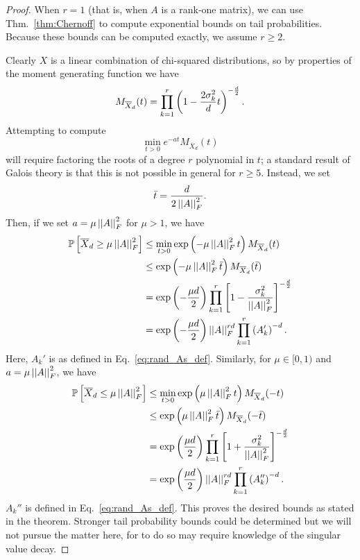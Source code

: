 \begin{proof}
When $r=1$ (that is, when $A$ is a rank-one matrix),
we can use Thm.~\ref{thm:Chernoff} to compute exponential
bounds on tail probabilities.
Because these bounds can be computed exactly, we assume $r\ge2$.

Clearly $X$ is a linear combination of chi-squared distributions,
so by properties of the moment generating function we have
%
\begin{equation}
    M_{\overline{X}_{d}}(t) =
    \prod_{k=1}^{r}
    \left( 1 - \frac{2\sigma_{k}^{2}}{d}t \right)^{-\frac{d}{2}}.
\end{equation}
%
Attempting to compute
%
\begin{equation}
    \min_{t>0} e^{-at}M_{\overline{X}_{d}}(t)
\end{equation}
%
will require factoring the roots of a degree $r$ polynomial in $t$;
a standard result of Galois theory is that this is not possible
in general for $r\ge5$.
Instead, we set
%
\begin{equation}
    \bar{t} = \frac{d}{2\left| \left| A \right| \right|_{F}^{2}}.
\end{equation}
%
Then, if we set $a = \mu\left| \left| A \right| \right|_{F}^{2}$ for $\mu>1$, we have
%
\begin{align}
    \mathbb{P}\left[ \overline{X}_{d}\ge \mu\left| \left| A \right| \right|_{F}^{2} \right]
    &\le \min_{t>0} \exp\left( -\mu\left| \left| A \right| \right|_{F}^{2}t \right) M_{\overline{X}_{d}}(t)
        \nonumber\\
    &\le \exp\left( -\mu\left| \left| A \right| \right|_{F}^{2}\bar{t} \right) M_{\overline{X}_{d}}(\bar{t})
        \nonumber\\
    &= \exp\left( -\frac{\mu d}{2} \right)\prod_{k=1}^{r}
        \left[ 1-\frac{\sigma_{k}^{2}}{\left| \left| A \right| \right|_{F}^{2}} \right]^{-\frac{d}{2}}
        \nonumber\\
    &= \exp\left( -\frac{\mu d}{2} \right)\left| \left| A \right| \right|_{F}^{rd} \prod_{k=1}^{r}
        \left( A_{k}' \right)^{-d}.
\end{align}
%
Here, $A_{k}'$ is as defined in Eq.~\eqref{eq:rand_As_def}.
Similarly, for $\mu\in[0,1)$ and $a = \mu\left| \left| A \right| \right|_{F}^{2}$, we have
%
\begin{align}
    \mathbb{P}\left[ \overline{X}_{d}\le \mu\left| \left| A \right| \right|_{F}^{2} \right]
    &\le \min_{t>0} \exp\left( \mu\left| \left| A \right| \right|_{F}^{2}t \right) M_{\overline{X}_{d}}(-t)
        \nonumber\\
    &\le \exp\left( \mu\left| \left| A \right| \right|_{F}^{2}\bar{t} \right) M_{\overline{X}_{d}}(-\bar{t})
        \nonumber\\
    &= \exp\left( \frac{\mu d}{2} \right)\prod_{k=1}^{r}
        \left[ 1+\frac{\sigma_{k}^{2}}{\left| \left| A \right| \right|_{F}^{2}} \right]^{-\frac{d}{2}}
        \nonumber\\
    &= \exp\left( \frac{\mu d}{2} \right)\left| \left| A \right| \right|_{F}^{rd} \prod_{k=1}^{r}
        \left( A_{k}'' \right)^{-d}.
\end{align}
%
$A_{k}''$ is defined in Eq.~\eqref{eq:rand_As_def}.
This proves the desired bounds as stated in the theorem.
Stronger tail probability bounds could be determined but we will
not pursue the matter here, for to do so may require
knowledge of the singular value decay.




\end{proof}
